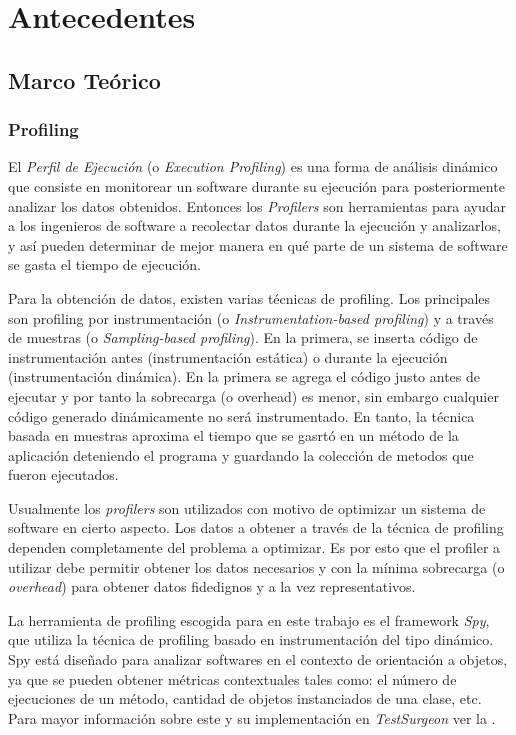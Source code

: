 \chapter{Antecedentes}


\section{Marco Teórico}

\subsection{Profiling}

\par El \emph{Perfil de Ejecución} (o \emph{Execution Profiling}) es una forma de análisis dinámico que consiste en monitorear un software durante su ejecución para posteriormente analizar los datos obtenidos. Entonces los \emph{Profilers} son herramientas para ayudar a los ingenieros de software a recolectar datos durante la ejecución y analizarlos, y así pueden determinar de mejor manera en qué parte de un sistema de software se gasta el tiempo de ejecución.


\par Para la obtención de datos, existen varias técnicas de profiling. Los principales son profiling por instrumentación (o \emph{Instrumentation-based profiling}) y a través de muestras (o \emph{Sampling-based profiling}). En la primera, se inserta código de instrumentación antes (instrumentación estática) o durante la ejecución (instrumentación dinámica). En la primera se agrega el código justo antes de ejecutar y por tanto la sobrecarga (o overhead) es menor, sin embargo cualquier código generado dinámicamente no será instrumentado. En tanto, la técnica basada en muestras aproxima el tiempo que se gasrtó en un método de la aplicación deteniendo el programa y guardando la colección de metodos que fueron ejecutados.

\par Usualmente los \emph{profilers} son utilizados con motivo de optimizar un sistema de software en cierto aspecto. Los datos a obtener a través de la técnica de profiling dependen completamente del problema a optimizar. Es por esto que el profiler a utilizar debe permitir obtener los datos necesarios y con la mínima sobrecarga (o \emph{overhead}) para obtener datos fidedignos y a la vez representativos. 


\par La herramienta de profiling escogida para en este trabajo es el framework \emph{Spy}, que utiliza la técnica de profiling basado en instrumentación del tipo dinámico. Spy está diseñado para analizar softwares en el contexto de orientación a objetos, ya que se pueden obtener métricas contextuales tales como: el número de ejecuciones de un método, cantidad de objetos instanciados de una clase, etc. Para mayor información sobre este y su implementación en \emph{TestSurgeon} ver la . 

